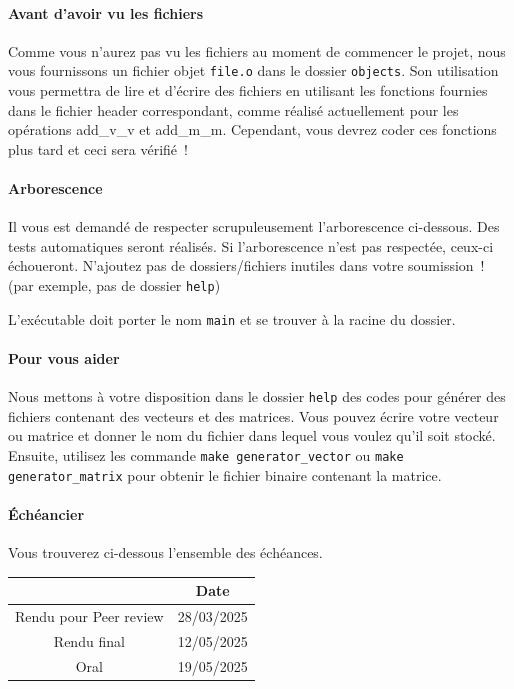 \documentclass[a4paper, 12pt]{article}
\begin{document}
\paragraph{Avant d'avoir vu les fichiers} Comme vous n'aurez pas vu les fichiers au moment de commencer le projet, nous vous fournissons un fichier objet \texttt{file.o} dans le dossier \texttt{objects}. Son utilisation vous permettra de lire et d'écrire des fichiers en utilisant les fonctions fournies dans le fichier header correspondant, comme réalisé actuellement pour les opérations add\_v\_v et add\_m\_m. Cependant, vous devrez coder ces fonctions plus tard et ceci sera vérifié~!

\paragraph{Arborescence}
Il vous est demandé de respecter scrupuleusement l'arborescence ci-dessous. Des tests automatiques seront réalisés. Si l'arborescence n'est pas respectée, ceux-ci échoueront. N'ajoutez pas de dossiers/fichiers inutiles dans votre soumission~! (par exemple, pas de dossier \texttt{help})

\noindent L'exécutable doit porter le nom \texttt{main} et se trouver à la racine du dossier.

\paragraph{Pour vous aider} Nous mettons à votre disposition dans le dossier \texttt{help} des codes pour générer des fichiers contenant des vecteurs et des matrices. Vous pouvez écrire votre vecteur ou matrice et donner le nom du fichier dans lequel vous voulez qu'il soit stocké. Ensuite, utilisez les commande \texttt{make generator\_vector} ou \texttt{make generator\_matrix} pour obtenir le fichier binaire contenant la matrice.

\paragraph{Échéancier} Vous trouverez ci-dessous l'ensemble des échéances.
\begin{table}[!htb]
\centering
    \begin{tabular}{|c|c|}
        \hline
            & Date\\
        \hline
        Rendu pour Peer review  & 28/03/2025\\
        \hline
        Rendu final & 12/05/2025\\
        \hline
        Oral & 19/05/2025\\
        \hline
    \end{tabular}
\end{table}
\end{document}

